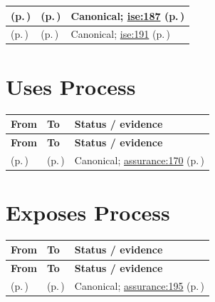 \begin{longtable}{|>{\raggedright\arraybackslash}p{0.32\TableWidth}|>{\raggedright\arraybackslash}p{0.32\TableWidth}|>{\raggedright\arraybackslash}p{0.36\TableWidth}|}
\nameref{function:coordinate-to-do} (p.\,\pageref{function:coordinate-to-do}) & \nameref{process:to-do-progression-process} (p.\,\pageref{process:to-do-progression-process}) & Canonical; \hyperref[rad:ise:171]{ise:187} (p.\,\pageref{rad:ise:171})\\\hline
\nameref{function:coordinate-synthetic-task} (p.\,\pageref{function:coordinate-synthetic-task}) & \nameref{process:synthetic-task-progression-process} (p.\,\pageref{process:synthetic-task-progression-process}) & Canonical; \hyperref[rad:ise:171]{ise:191} (p.\,\pageref{rad:ise:171})\\\hline
\end{longtable}\endgroup
\section{Uses Process}
\begingroup\small\setlength{\TableWidth}{\dimexpr\linewidth-6\tabcolsep-4\arrayrulewidth\relax}
\begin{longtable}{|>{\raggedright\arraybackslash}p{0.32\TableWidth}|>{\raggedright\arraybackslash}p{0.32\TableWidth}|>{\raggedright\arraybackslash}p{0.36\TableWidth}|}
\hline\rowcolor{TableHead}\textbf{From} & \textbf{To} & \textbf{Status / evidence}\\\hline\endfirsthead
\hline\rowcolor{TableHead}\textbf{From} & \textbf{To} & \textbf{Status / evidence}\\\hline\endhead
\hline\endfoot
\nameref{service:request-service-assurance} (p.\,\pageref{service:request-service-assurance}) & \nameref{process:assurance-process-execution} (p.\,\pageref{process:assurance-process-execution}) & Canonical; \hyperref[rad:assurance:166]{assurance:170} (p.\,\pageref{rad:assurance:166})\\\hline
\end{longtable}\endgroup
\section{Exposes Process}
\begingroup\small\setlength{\TableWidth}{\dimexpr\linewidth-6\tabcolsep-4\arrayrulewidth\relax}
\begin{longtable}{|>{\raggedright\arraybackslash}p{0.32\TableWidth}|>{\raggedright\arraybackslash}p{0.32\TableWidth}|>{\raggedright\arraybackslash}p{0.36\TableWidth}|}
\hline\rowcolor{TableHead}\textbf{From} & \textbf{To} & \textbf{Status / evidence}\\\hline\endfirsthead
\hline\rowcolor{TableHead}\textbf{From} & \textbf{To} & \textbf{Status / evidence}\\\hline\endhead
\hline\endfoot
\nameref{service:communicate-service-assurance-outcome} (p.\,\pageref{service:communicate-service-assurance-outcome}) & \nameref{process:assurance-process-reporting-communication} (p.\,\pageref{process:assurance-process-reporting-communication}) & Canonical; \hyperref[rad:assurance:191]{assurance:195} (p.\,\pageref{rad:assurance:191})\\\hline
\end{longtable}\endgroup
